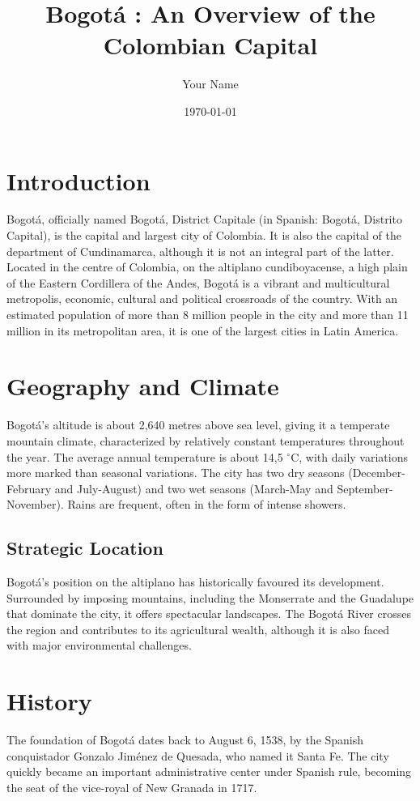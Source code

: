 \documentclass{article}
\title{Bogotá : An Overview of the Colombian Capital}
\author{Your Name}
\date{\today}
\begin{document}
\maketitle

\section{Introduction}
Bogotá, officially named Bogotá, District Capitale (in Spanish: Bogotá, Distrito Capital), is the capital and largest city of Colombia. It is also the capital of the department of Cundinamarca, although it is not an integral part of the latter. Located in the centre of Colombia, on the altiplano cundiboyacense, a high plain of the Eastern Cordillera of the Andes, Bogotá is a vibrant and multicultural metropolis, economic, cultural and political crossroads of the country. With an estimated population of more than 8 million people in the city and more than 11 million in its metropolitan area, it is one of the largest cities in Latin America.

\section{Geography and Climate}
Bogotá's altitude is about 2,640 metres above sea level, giving it a temperate mountain climate, characterized by relatively constant temperatures throughout the year. The average annual temperature is about 14,5 $^\circ$C, with daily variations more marked than seasonal variations. The city has two dry seasons (December-February and July-August) and two wet seasons (March-May and September-November). Rains are frequent, often in the form of intense showers.

\subsection{Strategic Location}
Bogotá's position on the altiplano has historically favoured its development. Surrounded by imposing mountains, including the Monserrate and the Guadalupe that dominate the city, it offers spectacular landscapes. The Bogotá River crosses the region and contributes to its agricultural wealth, although it is also faced with major environmental challenges.

\section{History}
The foundation of Bogotá dates back to August 6, 1538, by the Spanish conquistador Gonzalo Jiménez de Quesada, who named it Santa Fe. The city quickly became an important administrative center under Spanish rule, becoming the seat of the vice-royal of New Granada in 1717.
\end{document}
